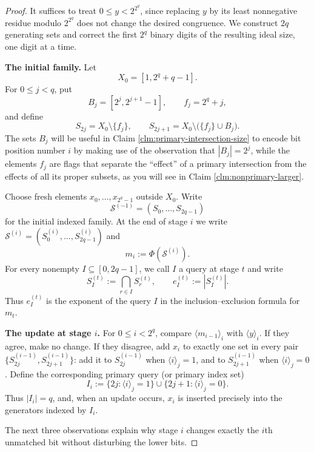 \documentclass[11pt]{article}
\theoremstyle{definition}
\theoremstyle{remark}
\begin{document}
\begin{proof}
It suffices to treat $0\le y<2^{2^q}$, since replacing $y$ by its least
nonnegative residue modulo $2^{2^q}$ does not change the desired congruence.
We construct $2q$ generating sets and correct the first $2^q$ binary digits
of the resulting ideal size, one digit at a time.

\smallskip
\noindent\textbf{The initial family.}
Let
\[
  X_0=[1,2^q+q-1].
\]
For $0\le j<q$, put
\[
  B_j=[2^j,2^{j+1}-1],
  \qquad f_j=2^q+j,
\]
and define
\begin{equation}
  S_{2j}=X_0\setminus\{f_j\},
  \qquad
  S_{2j+1}=X_0\setminus\bigl(\{f_j\}\cup B_j\bigr).
  \label{eq:bit-initial-sets}
\end{equation}
The sets $B_j$ will be useful in Claim  \ref  {clm:primary-intersection-size} to  encode bit position number $i$ by making use of the observation that 
$|B_j| = 2^j$, while the elements $f_j$ are flags
that separate the ``effect'' of a primary intersection from the effects of all its proper subsets, as you will see in Claim \ref {clm:nonprimary-larger}.


Choose fresh elements $x_0,\ldots,x_{2^q-1}$ outside $X_0$. Write
\[
  \mathcal S^{(-1)}=(S_0,\ldots,S_{2q-1})
\]
for the initial indexed family. At the end of stage $i$ we write
$\mathcal S^{(i)}=(S_0^{(i)},\ldots,S_{2q-1}^{(i)})$ and
\[
  m_i:=\Phi(\mathcal S^{(i)}).
\]
For every nonempty $I\subseteq[0,2q-1]$, we call $I$ a query at stage $t$ and write
\[
  S_I^{(t)}:=\bigcap_{r\in I}S_r^{(t)},
  \qquad e_I^{(t)}:=|S_I^{(t)}|.
\]
Thus $e_I^{(t)}$ is the exponent of the query $I$ in the inclusion--exclusion formula for $m_t$.

\smallskip
\noindent\textbf{The update at stage $i$.}
For $0\le i<2^q$, compare $\langle m_{i-1}\rangle_i$ with
$\langle y\rangle_i$. If they agree, make no change. If they disagree, add
$x_i$ to exactly one set in every pair
$\{S_{2j}^{(i-1)},S_{2j+1}^{(i-1)}\}$: add it to $S_{2j}^{(i-1)}$ when
$\langle i\rangle_j=1$, and to $S_{2j+1}^{(i-1)}$ when
$\langle i\rangle_j=0$. Define the corresponding primary query (or primary index set)
\begin{equation}
  I_i:=\{2j:\langle i\rangle_j=1\}
  \cup\{2j+1:\langle i\rangle_j=0\}.
  \label{eq:primary-index-set}
\end{equation}
Thus $|I_i|=q$, and, when an update occurs, $x_i$ is inserted precisely into
the generators indexed by $I_i$.

The next three observations explain why stage $i$ changes exactly the $i$th
unmatched bit without disturbing the lower bits.


\end{proof}
\end{document}
